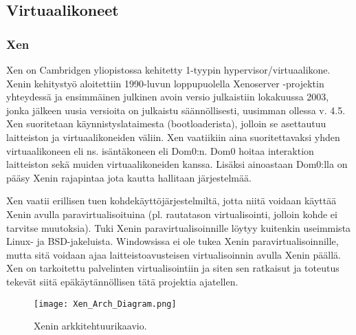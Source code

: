 \subsection{Virtuaalikoneet}
\subsubsection{Xen}
Xen on Cambridgen yliopistossa kehitetty 1-tyypin hypervisor/virtuaalikone. %
Xenin kehitystyö aloitettiin 1990-luvun loppupuolella Xenoserver -projektin yhteydessä ja ensimmäinen julkinen avoin versio julkaistiin lokakuussa 2003, jonka jälkeen uusia versioita on julkaistu säännöllisesti, uusimman ollessa v. 4.5. \cite{xen_history} Xen suoritetaan käynnistyslataimesta (bootloaderista), jolloin se asettautuu laitteiston ja virtuaalikoneiden väliin. Xen vaatiikiin aina suoritettavaksi yhden virtuaalikoneen eli ns. isäntäkoneen eli Dom0:n. Dom0 hoitaa interaktion laitteiston sekä muiden virtuaalikoneiden kanssa. Lisäksi ainoastaan Dom0:lla on pääsy Xenin rajapintaa jota kautta hallitaan järjestelmää.

Xen vaatii erillisen tuen kohdekäyttöjärjestelmiltä, jotta niitä voidaan käyttää Xenin avulla paravirtualisoituina (pl. rautatason virtualisointi, jolloin kohde ei tarvitse muutoksia). Tuki Xenin paravirtualisoinnille löytyy kuitenkin useimmista Linux- ja BSD-jakeluista. Windowsissa ei ole tukea Xenin paravirtualisoinnille, mutta sitä voidaan ajaa laitteistoavusteisen virtualisoinnin avulla Xenin päällä. Xen on tarkoitettu palvelinten virtualisointiin ja siten sen ratkaisut ja toteutus tekevät siitä epäkäytännöllisen tätä projektia ajatellen. \cite{xen_overview}


\begin{figure}[H]
\centering
\texttt{[image: Xen\_Arch\_Diagram.png]}
\caption{Xenin arkkitehtuurikaavio.}
\end{figure}


